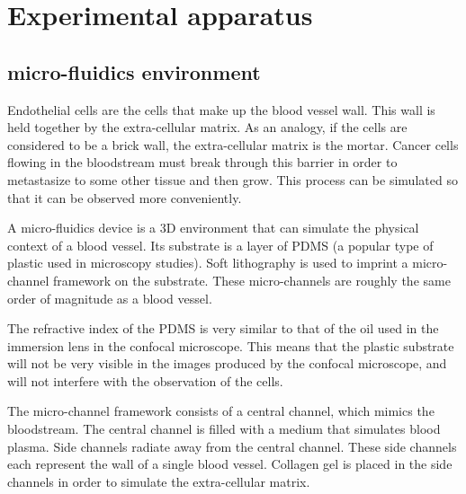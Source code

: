 
\chapter{Experimental apparatus}

\ifpdf
    \graphicspath{{Chapter4/Figs/Raster/}{Chapter4/Figs/PDF/}{Chapter4/Figs/}}
\else
    \graphicspath{{Chapter4/Figs/Vector/}{Chapter4/Figs/}}
\fi

\section{micro-fluidics environment}

Endothelial cells are the cells that make up the blood vessel wall. This wall is held together by the extra-cellular matrix. As an analogy, if the cells are considered to be a brick wall, the extra-cellular matrix is the mortar. Cancer cells flowing in the bloodstream must break through this barrier in order to metastasize to some other tissue and then grow. This process can be simulated so that it can be observed more conveniently.

A micro-fluidics device is a 3D environment that can simulate the physical context of a blood vessel. Its substrate is a layer of PDMS (a popular type of plastic used in microscopy studies). Soft lithography is used to imprint a micro-channel framework on the substrate. These micro-channels are roughly the same order of magnitude as a blood vessel.

The refractive index of the PDMS is very similar to that of the oil used in the immersion lens in the confocal microscope. This means that the plastic substrate will not be very visible in the images produced by the confocal microscope, and will not interfere with the observation of the cells.

The micro-channel framework consists of a central channel, which mimics the bloodstream. The central channel is filled with a medium that simulates blood plasma. Side channels radiate away from the central channel. These side channels each represent the wall of a single blood vessel. Collagen gel is placed in the side channels in order to simulate the extra-cellular matrix.

